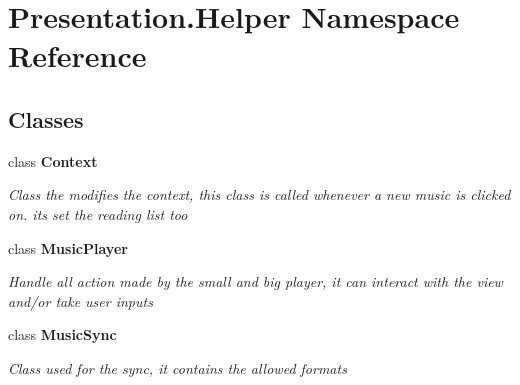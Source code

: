 \hypertarget{namespace_presentation_1_1_helper}{}\section{Presentation.\+Helper Namespace Reference}
\label{namespace_presentation_1_1_helper}
\subsection*{Classes}
\begin{DoxyCompactItemize}
\item 
class {\bfseries Context}
\begin{DoxyCompactList}\small\item\em Class the modifies the context, this class is called whenever a new music is clicked on. it\textquotesingle{}s set the reading list too \end{DoxyCompactList}\item 
class {\bfseries Music\+Player}
\begin{DoxyCompactList}\small\item\em Handle all action made by the small and big player, it can interact with the view and/or take user inputs \end{DoxyCompactList}\item 
class {\bfseries Music\+Sync}
\begin{DoxyCompactList}\small\item\em Class used for the sync, it contains the allowed formats \end{DoxyCompactList}\end{DoxyCompactItemize}
